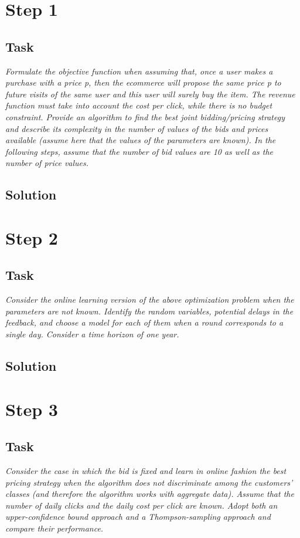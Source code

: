\documentclass[12pt,a4paper]{report}
\begin{document}
		\section{Step 1}
			\subsection{Task}
\textit{Formulate the objective function when assuming that, once a user makes a purchase with a price p, then the ecommerce will propose the same price p to future visits of the same user and this user will surely buy the item. The revenue function must take into account the cost per click, while there is no budget constraint. Provide an algorithm to find the best joint bidding/pricing strategy and describe its complexity in the number of values of the bids and prices available (assume here that the values of the parameters are known). In the following steps, assume that the number of bid values are 10 as well as the number of price values.}
			\subsection{Solution}

		\section{Step 2}
			\subsection{Task}
\textit{Consider the online learning version of the above optimization problem when the parameters are not known. Identify the random variables, potential delays in the feedback, and choose a model for each of them when a round corresponds to a single day. Consider a time horizon of one year.}
			\subsection{Solution}

		\section{Step 3}
			\subsection{Task}
\textit{Consider the case in which the bid is fixed and learn in online fashion the best pricing strategy when the algorithm does not discriminate among the customers’ classes (and therefore the algorithm works with aggregate data). Assume that the number of daily clicks and the daily cost per click are known. Adopt both an upper-confidence bound approach and a Thompson-sampling approach and compare their performance.}
\end{document}
